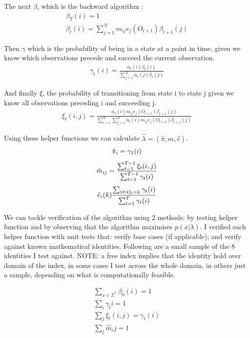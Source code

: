 The next $\beta$, which is the backward algorithm :
\begin{gather*}
    \beta_T(i)=1\\
    \beta_t(i)=\sum_{j=1}^N m_{ij} e_j(O_{t+1}) \beta_{t+1}(j)
\end{gather*}

Then $\gamma$ which is the probability of being in a state at a point in time, given we know which observations precede and succeed the current observation.
\begin{gather*}
    \gamma_t(i) = \frac{\alpha_t(i) \beta_t(i)}{\sum_{j=1}^N \alpha_t(j) \beta_t(j)}
\end{gather*}

And finally $\xi$, the probability of transitioning from state i to state j given we know all observations preceding i and succeeding j.
\begin{gather*}
    \xi_t(i, j) = \frac{\alpha_t(i) m_{ij} e_j(O_{t+1}) \beta_{t+1}(j)}{\sum_{i=1}^N \sum_{j=1}^N \alpha_t(i) m_{ij} e_j(O_{t+1}) \beta_{t+1}(j)}
\end{gather*}

Using these helper functions we can calculate $\hat{\lambda}=(\hat{\pi}, \hat{m}, \hat{e})$.
\begin{gather*}
    \hat{\pi}_i = \gamma_1(i)\biggbreak
    \hat{m}_{ij} = \frac{\sum_{t=1}^{T-1} \xi_t(i,j)}{\sum_{t=1}^{T-1} \gamma_t(i)}\biggbreak
    \hat{e}_i(k) \frac{\sum_{\forall t: O_t = k} \gamma_t(i)}{\sum_{t=1}^T \gamma_t(i)}
\end{gather*}


We can tackle verification of the algorithm using 2 methods: by testing helper function and by observing that the algorithm maximises $p(x|\lambda)$. I verified each helper function with unit tests that: verify base cases (if applicable); and verify against known mathematical identities. Following are a small sample of the 8 identities I test against. NOTE: a free index implies that the identity hold over domain of the index, in some cases I test across the whole domain, in others just a sample, depending on what is computationally feasible.

\begin{gather*}
    \sum_{x \in \Sigma^*} \beta_0(i) = 1\\
    \sum_{i} \gamma_t{i} = 1\\
    \sum_{j} \xi_t(i,j) = \gamma_t(i)\\
    \sum_j \hat{m}_ij = 1\\
\end{gather*}


